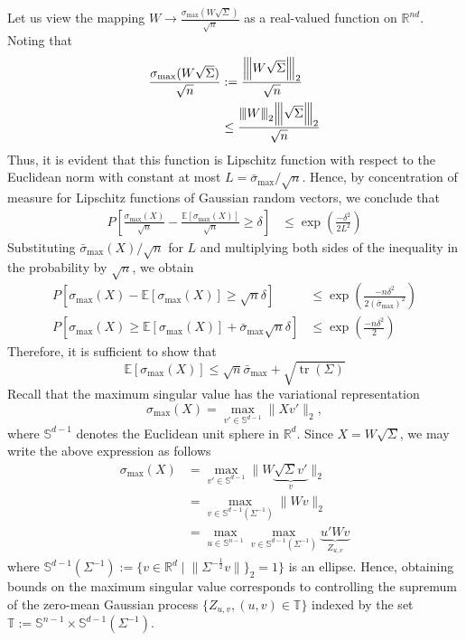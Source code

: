 \documentclass[10pt,handout,english]{beamer}
\DeclareMathOperator{\tr}{tr}
\newcommand{\E}{\mathbb{E}}
\newcommand{\R}{\mathbb{R}}
\newcommand{\T}{\mathbb{T}}
\renewcommand{\S}{\mathbb{S}}
\newcommand{\vertiii}[1]{{\left\vert\kern-0.25ex\left\vert\kern-0.25ex\left\vert #1 
    \right\vert\kern-0.25ex\right\vert\kern-0.25ex\right\vert}}
\begin{document}
\begin{frame}[allowframebreaks]
Let us view the mapping $W\to\frac{\sigma_{\max}(W\sqrt{\Sigma})}{\sqrt{n}}$ as a real-valued function on $\R^{nd}$. Noting that
\begin{align*}
\frac{\sigma_{\max}(W\sqrt{\Sigma})}{\sqrt{n}}&:= \frac{\vertiii{W\sqrt{\Sigma} }_2}{\sqrt{n}}\\
&\leq\frac{\vertiii{W}_2\vertiii{\sqrt{\Sigma}}_2}{\sqrt{n}}
\end{align*}
Thus, it is evident that this function is Lipschitz function with respect to the Euclidean norm with constant at most $L=\bar{\sigma}_{\max}/\sqrt{n}$. Hence, by concentration of measure for Lipschitz functions of Gaussian random vectors, we conclude that
\begin{align*}
P\left[\frac{\sigma_{\max}(X)}{\sqrt{n}}-\frac{\E[\sigma_{\max}(X)]}{\sqrt{n}} \geq \delta\right]&\leq\exp\left(\frac{-\delta^2}{2L^2}\right)
\end{align*}
Substituting $\bar{\sigma}_{\max}(X)/\sqrt{n}$ for $L$ and multiplying both sides of the inequality in the probability by $\sqrt{n}$, we obtain
\begin{align*}
P[\sigma_{\max}(X)-\E[\sigma_{\max}(X)] \geq \sqrt{n}\delta]&\leq\exp\left(\frac{-n\delta^2 }{2(\bar{\sigma}_{\max})^2}\right)\\
P[\sigma_{\max}(X)\geq\E[\sigma_{\max}(X)] +\bar{\sigma}_{\max} \sqrt{n}\delta]&\leq\exp\left(\frac{-n\delta^2 }{2}\right)
\end{align*}
Therefore, it is sufficient to show that 
\[
\E[\sigma_{\max}(X)]\leq\sqrt{n}\bar{\sigma}_{\max}+\sqrt{\tr(\Sigma)}
\]
Recall that the maximum singular value has the variational representation
\[
\sigma_{\max}(X)=\max_{v'\in \S^{d-1}}\lVert Xv'\rVert_2,
\]
where $\S^{d-1}$ denotes the Euclidean unit sphere in $\R^d$. Since $X=W\sqrt{\Sigma}$, we may write the above expression as follows
\begin{align*}
\sigma_{\max}(X)&=\max_{v'\in \S^{d-1}}\lVert W\underbrace{\sqrt{\Sigma}v'}_{v}\rVert_2\\
&=\max_{v\in \S^{d-1}(\Sigma^{-1})}\lVert Wv\rVert_2\\
&=\max_{u\in \S^{n-1}}\max_{v\in \S^{d-1}(\Sigma^{-1})}\underbrace{u'Wv}_{Z_{u,v}}
\end{align*}
where $\S^{d-1}(\Sigma^{-1}):=\{v\in\R^d\mid\lVert\Sigma^{-\frac{1}{2}}v\rVert\}_2=1\}$ is an ellipse. Hence, obtaining bounds on the maximum singular value corresponds to controlling the supremum of the zero-mean Gaussian process $\{Z_{u,v},(u,v)\in \T\}$ indexed by the set $\T:=\S^{n-1}\times \S^{d-1}(\Sigma^{-1})$. 
\end{frame}
\end{document}
